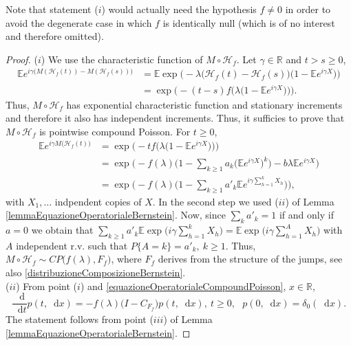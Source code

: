 \documentclass[12pt, twoside, english, headsepline]{article}
\newcommand*\dif{\mathop{}\!\mathrm{d}}  %
\theoremstyle{definition} %
\numberwithin{equation}{section} %
\begin{document}
Note that statement ($i$) would actually need the hypothesis $f\not=0$ in order to avoid the degenerate case in which $f$ is identically null (which is of no interest and therefore omitted).

\begin{proof}
	($i$) We use the characteristic function of $M\circ \mathcal{H}_f$. Let $\gamma \in \mathbb{R}$ and $t>s\ge0$, 
	\begin{align}
		\mathbb{E} e^{i\gamma \big(M(\mathcal{H}_f(t))-M(\mathcal{H}_f(s))\big)} &= \mathbb{E} \exp\Big(-\lambda \big(\mathcal{H}_f(t)-\mathcal{H}_f(s)\big) \big(1-\mathbb{E}e^{i\gamma X}\big) \Big)\nonumber\\
		& = \exp\Bigg(-(t-s)f\Big(\lambda\big(1-\mathbb{E}e^{i\gamma X}\big) \Big) \Bigg).\nonumber
	\end{align}
	Thus, $M\circ \mathcal{H}_f$ has exponential characteristic function and stationary increments and therefore it also has independent increments. Thus, it sufficies to prove that $M\circ \mathcal{H}_f$ is pointwise compound Poisson. For $t\ge0$,
		\begin{align}
		\mathbb{E} e^{i\gamma M\big(\mathcal{H}_f(t)\big)} &= \exp\Bigg(-t f\Big(\lambda\big(1-\mathbb{E}e^{i\gamma X}\big) \Big) \Bigg) \nonumber\\
		& = \exp \Bigg(-f(\lambda)\Big(1-\sum_{k\ge1} a_k\big(\mathbb{E}e^{i\gamma X}\big)^k \Big) - b\lambda \mathbb{E}e^{i\gamma X} \Bigg) \nonumber\\
		& =  \exp \Bigg(-f(\lambda)\Big(1-\sum_{k\ge1} a'_k \mathbb{E}e^{i\gamma \sum_{h=1}^k X_h}\Big) \Bigg),
	\end{align}
	with $X_1,\dots $ indpendent copies of $X$. In the second step we used ($ii$) of Lemma \ref{lemmaEquazioneOperatorialeBernstein}. Now, since $\sum_{k} a'_k = 1$ if and only if $a=0$ we obtain that $\sum_{k\ge1} a'_k  \mathbb{E}\exp\big(i\gamma \sum_{h=1}^k X_h\big) = \mathbb{E}\exp\big(i\gamma \sum_{h=1}^A X_h\big)$ with $A$ independent r.v. such that $P\{A = k\}=a'_k,\ k\ge1$. Thus, $M\circ\mathcal{H}_f\sim CP\big(f(\lambda), F_f\big)$, where $F_f$ derives from the structure of the jumps, see also \eqref{distribuzioneComposizioneBernstein}.
	\\
	($ii$) From point ($i$) and \eqref{equazioneOperatorialeCompoundPoisson}, $x\in\mathbb{R}$,
	\begin{equation*}
		\frac{\dif}{\dif t}p(t, \dif x) = - f(\lambda)\big(I-C_{F_f}\big)p(t, \dif x), \ t\ge0,\ \ \ p(0,\dif x) = \delta_0(\dif x).
	\end{equation*} 
	The statement follows from point ($iii$) of Lemma \ref{lemmaEquazioneOperatorialeBernstein}.	
\end{proof}
\end{document}

